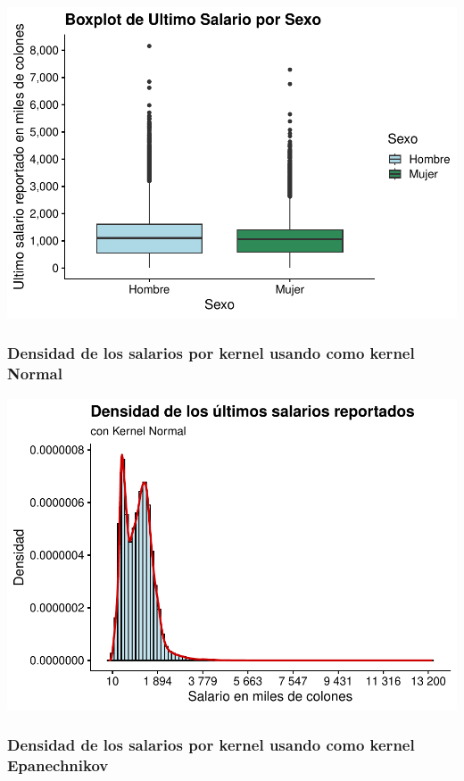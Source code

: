 \documentclass[
]{article}
\begin{document}
\includegraphics{Tarea1_files/figure-latex/unnamed-chunk-10-1.pdf}

\hypertarget{densidad-de-los-salarios-por-kernel-usando-como-kernel-normal}{%
\subsubsection{Densidad de los salarios por kernel usando como kernel
Normal}\label{densidad-de-los-salarios-por-kernel-usando-como-kernel-normal}}

\includegraphics{Tarea1_files/figure-latex/unnamed-chunk-11-1.pdf}

\hypertarget{densidad-de-los-salarios-por-kernel-usando-como-kernel-epanechnikov}{%
\subsubsection{Densidad de los salarios por kernel usando como kernel
Epanechnikov}\label{densidad-de-los-salarios-por-kernel-usando-como-kernel-epanechnikov}}
\end{document}
